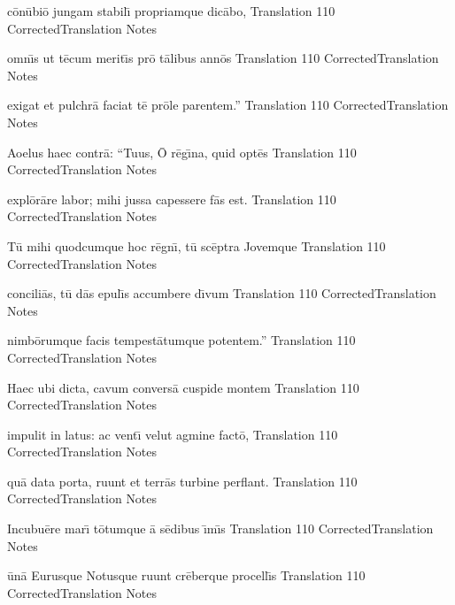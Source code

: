 \latline
  {c\={\macron o}n\={\macron u}bi\={\macron o} jungam stabil\={\macron \i} propriamque dic\={\macron a}bo,
}
  { Translation }
  {110}
  { CorrectedTranslation }
  { Notes }

\newpage
\latline
  {omn\={\macron \i}s ut t\={\macron e}cum merit\={\macron \i}s pr\={\macron o} t\={\macron a}libus ann\={\macron o}s
}
  { Translation }
  {110}
  { CorrectedTranslation }
  { Notes }


\latline
  {exigat et pulchr\={\macron a} faciat t\={\macron e} pr\={\macron o}le parentem.''
}
  { Translation }
  {110}
  { CorrectedTranslation }
  { Notes }


\latline
  {Aoelus haec contr\={\macron a}:  ``Tuus, \={\macron O} r\={\macron e}g\={\macron \i}na, quid opt\={\macron e}s
}
  { Translation }
  {110}
  { CorrectedTranslation }
  { Notes }
\newpage

\latline
  {expl\={\macron o}r\={\macron a}re labor; mihi jussa capessere f\={\macron a}s est.
}
  { Translation }
  {110}
  { CorrectedTranslation }
  { Notes }


\latline
  {T\={\macron u} mihi quodcumque hoc r\={\macron e}gn\={\macron \i}, t\={\macron u} sc\={\macron e}ptra Jovemque
}
  { Translation }
  {110}
  { CorrectedTranslation }
  { Notes }


\latline
  {concili\={\macron a}s, t\={\macron u} d\={\macron a}s epul\={\macron \i}s accumbere d\={\macron \i}vum
}
  { Translation }
  {110}
  { CorrectedTranslation }
  { Notes }
\newpage

\latline
  {nimb\={\macron o}rumque facis tempest\={\macron a}tumque potentem.''
}
  { Translation }
  {110}
  { CorrectedTranslation }
  { Notes }


\latline
  {Haec ubi dicta, cavum convers\={\macron a} cuspide montem
}
  { Translation }
  {110}
  { CorrectedTranslation }
  { Notes }


\latline
  {impulit in latus:  ac vent\={\macron \i} velut agmine fact\={\macron o},
}
  { Translation }
  {110}
  { CorrectedTranslation }
  { Notes }

\newpage
\latline
  {qu\={\macron a} data porta, ruunt et terr\={\macron a}s turbine perflant.
}
  { Translation }
  {110}
  { CorrectedTranslation }
  { Notes }


\latline
  {Incubu\={\macron e}re mar\={\macron \i} t\={\macron o}tumque \={\macron a} s\={\macron e}dibus \={\macron \i}m\={\macron \i}s
}
  { Translation }
  {110}
  { CorrectedTranslation }
  { Notes }


\latline
  {\={\macron u}n\={\macron a} Eurusque Notusque ruunt cr\={\macron e}berque procell\={\macron \i}s
}
  { Translation }
  {110}
  { CorrectedTranslation }
  { Notes }
\newpage

